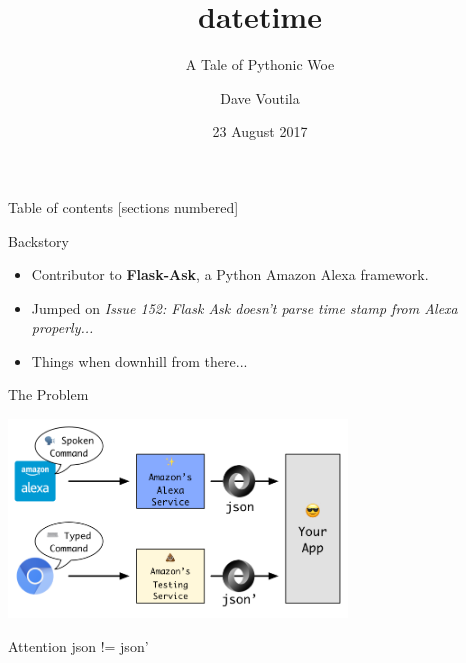 \documentclass[10pt]{beamer}
\title{datetime}
\subtitle{A Tale of Pythonic Woe}
\date{23 August 2017}
\author{Dave Voutila}
\institute{Sisu Integrated Services, LLC}
\begin{document}
\maketitle

\begin{frame}{Table of contents}
  [sections numbered]
  \tableofcontents[hideallsubsections]
\end{frame}

\begin{frame}[fragile]{Backstory}
\begin{itemize}
\item Contributor to \textbf{Flask-Ask}, a Python Amazon Alexa framework.
\item Jumped on \textit{Issue 152: Flask Ask doesn't parse time stamp from Alexa properly...}
\item Things when downhill from there...
\end{itemize}

\end{frame}

\begin{frame}{The Problem}
\begin{center}
	\includegraphics[width=9cm]{./images/alexa-flow.png}
	\begin{alertblock}{Attention}
		json != json'
	\end{alertblock}
\end{center}
\end{frame}
\end{document}
